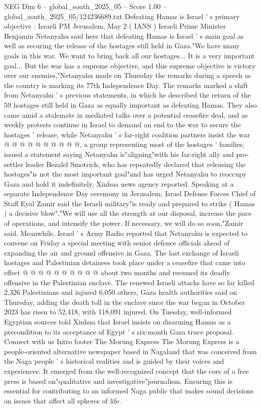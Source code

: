 \begin{textsample}{NEG Dim 6 – global\_south\_2025\_05 – Score 1.00 – global\_south\_2025\_05/124236689.txt}  \label{ex:f6_neg_419}
Defeating Hamas is Israel ' s primary objective : Israeli PM Jerusalem, May 2 ( IANS ) Israeli Prime Minister Benjamin Netanyahu said here that defeating Hamas is Israel ' s main goal as well as securing the release of the hostages still held in Gaza."We have many goals in this war.
We want to bring back all our hostages...
It is a very important goal...
But the war has a supreme objective, and this supreme objective is victory over our enemies,"Netanyahu made on Thursday the remarks during a speech as the country is marking its 77th Independence Day.
The remarks marked a shift from Netanyahu ' s previous statements, in which he described the return of the 59 hostages still held in Gaza as equally important as defeating Hamas.
They also came amid a stalemate in mediated talks over a potential ceasefire deal, and as weekly protests continue in Israel to demand an end to the war to secure the hostages ' release, while Netanyahu ' s far-right coalition partners insist the war @ @ @ @ @ @ @ @ @ @, a group representing most of the hostages ' families, issued a statement saying Netanyahu is"aligning"with his far-right ally and pro-settler leader Bezalel Smotrich, who has repeatedly declared that releasing the hostages"is not the most important goal"and has urged Netanyahu to reoccupy Gaza and hold it indefinitely, Xinhua news agency reported.
Speaking at a separate Independence Day ceremony in Jerusalem, Israel Defense Forces Chief of Staff Eyal Zamir said the Israeli military"is ready and prepared to strike ( Hamas ) a decisive blow"."We will use all the strength at our disposal, increase the pace of operations, and intensify the power.
If necessary, we will do so soon,"Zamir said.
Meanwhile, Israel ' s Army Radio reported that Netanyahu is expected to convene on Friday a special meeting with senior defence officials ahead of expanding the air and ground offensive in Gaza.
The last exchange of Israeli hostages and Palestinian detainees took place under a ceasefire that came into effect @ @ @ @ @ @ @ @ @ @ about two months and resumed its deadly offensive in the Palestinian enclave.
The renewed Israeli attacks have so far killed 2,326 Palestinians and injured 6,050 others, Gaza health authorities said on Thursday, adding the death toll in the enclave since the war began in October 2023 has risen to 52,418, with 118,091 injured.
On Tuesday, well-informed Egyptian sources told Xinhua that Israel insists on disarming Hamas as a precondition to its acceptance of Egypt ' s six-month Gaza truce proposal.
Connect with us Intro footer The Morung Express The Morung Express is a people-oriented alternative newspaper based in Nagaland that was conceived from the Naga people ' s historical realities and is guided by their voices and experiences.
It emerged from the well-recognized concept that the core of a free press is based on"qualitative and investigative"journalism.
Ensuring this is essential for contributing to an informed Naga public that makes sound decisions on issues that affect all spheres of life.

\end{textsample}
